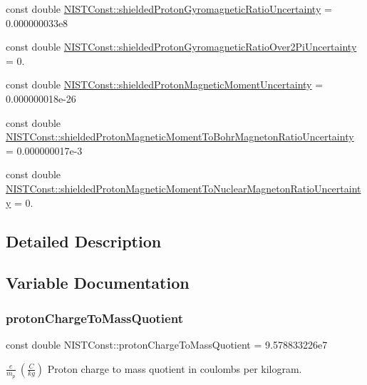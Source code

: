 \begin{DoxyCompactItemize}
\item 
const double \hyperlink{group___n_i_s_t_const-_proton_gae603375639410bab3920a82ad88e22b8}{N\+I\+S\+T\+Const\+::shielded\+Proton\+Gyromagnetic\+Ratio\+Uncertainty} = 0.\+000000033e8
\item 
const double \hyperlink{group___n_i_s_t_const-_proton_ga8a726ae1ce4a083a50cd2bb5c446cf15}{N\+I\+S\+T\+Const\+::shielded\+Proton\+Gyromagnetic\+Ratio\+Over2\+Pi\+Uncertainty} = 0.
\item 
const double \hyperlink{group___n_i_s_t_const-_proton_gafe8c348ee7683aa218402bf235838fbf}{N\+I\+S\+T\+Const\+::shielded\+Proton\+Magnetic\+Moment\+Uncertainty} = 0.\+000000018e-\/26
\item 
const double \hyperlink{group___n_i_s_t_const-_proton_ga4dc5506090e7cff7b2507713994e986d}{N\+I\+S\+T\+Const\+::shielded\+Proton\+Magnetic\+Moment\+To\+Bohr\+Magneton\+Ratio\+Uncertainty} = 0.\+000000017e-\/3
\item 
const double \hyperlink{group___n_i_s_t_const-_proton_ga26b2c035f1b78ca42fc9340314e5a106}{N\+I\+S\+T\+Const\+::shielded\+Proton\+Magnetic\+Moment\+To\+Nuclear\+Magneton\+Ratio\+Uncertainty} = 0.
\end{DoxyCompactItemize}


\subsection{Detailed Description}


\subsection{Variable Documentation}
\mbox{\label{group___n_i_s_t_const-_proton_ga59d127bca4ef5416e0e42c4d05c35a68}} 
\subsubsection{\texorpdfstring{proton\+Charge\+To\+Mass\+Quotient}{protonChargeToMassQuotient}}
{\footnotesize\ttfamily const double N\+I\+S\+T\+Const\+::proton\+Charge\+To\+Mass\+Quotient = 9.\+578833226e7}

$\frac{e}{m_p} \ (\frac{C}{kg})$ Proton charge to mass quotient in coulombs per kilogram. \mbox{\label{group___n_i_s_t_const-_proton_ga5040619a0a4a6ebd0d96e4bf6740a083}} 
